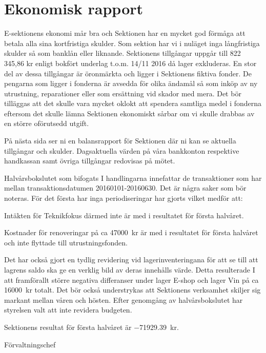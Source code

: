 \documentclass[../_main/handlingar.tex]{subfiles}
\begin{document}
\section{Ekonomisk rapport}

E-sektionens ekonomi mår bra och Sektionen har en mycket god förmåga att betala alla sina kortfristiga skulder. Som sektion har vi i nuläget inga långfristiga skulder så som banklån eller liknande. Sektionens tillgångar uppgår till 822 345,86 kr enligt bokfört underlag t.o.m. 14/11 2016 då lager exkluderas. En stor del av dessa tillgångar är öronmärkta och ligger i Sektionens fiktiva fonder. De pengarna som ligger i fonderna är avsedda för olika ändamål så som inköp av ny utrustning, reparationer eller som ersättning vid skador med mera. Det bör tilläggas att det skulle vara mycket oklokt att spendera samtliga medel i fonderna eftersom det skulle lämna Sektionen ekonomiskt sårbar om vi skulle drabbas av en större oförutsedd utgift.

På nästa sida ser ni en balansrapport för Sektionen där ni kan se aktuella tillgångar och skulder. Dagsaktuella värden på våra bankkonton respektive handkassan samt övriga tillgångar redovisas på mötet.

Halvårsbokslutet som bifogats I handlingarna innefattar de transaktioner som har mellan transaktionsdatumen 20160101-20160630. Det är några saker som bör noteras. För det första har inga periodiseringar har gjorts vilket medför att:
\begin{dashlist}
\item Intäkten för Teknikfokus därmed inte är med i resultatet för första halvåret.
\item Kostnader för renoveringar på ca \SI{47000}{kr} är med i resultatet för första halvåret och inte flyttade till utrustningsfonden.
\end{dashlist}

Det har också gjort en tydlig revidering vid lagerinventeringana för att se till att lagrens saldo ska ge en verklig bild av deras innehålls värde. Detta resulterade I att framförallt större negativa differanser under lager E-shop och lager Vin på ca \SI{16000}{kr} totalt.  Det bör också understrykas att Sektionens verksamhet skiljer sig markant mellan våren och hösten. Efter genomgång av halvårsbokslutet har styrelsen valt att inte revidera budgeten.

Sektionens resultat för första halvåret är \SI{-71929.39}{kr}.

\begin{signatures}{1}
    \mvh
    \signature{Anders Nilsson}{Förvaltningschef}
\end{signatures}
\end{document}
